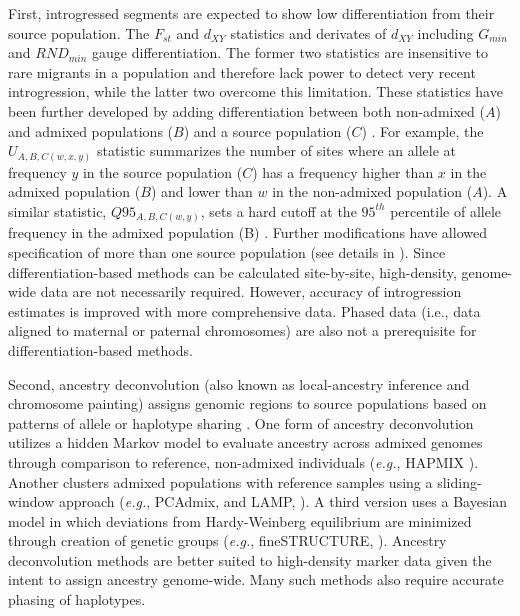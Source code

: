 \documentclass[11pt]{article}
\begin{document}
First, introgressed segments are expected to show low differentiation from their source population.
The $F_{st}$ and $d_{XY}$ statistics and derivates of $d_{XY}$ including $G_{min}$ \citep{geneva2015} and $RND_{min}$ \citep{rosenzweig2016} gauge differentiation. 
The former two statistics are insensitive to rare migrants in a population and therefore lack power to detect very recent introgression, while the latter two overcome this limitation.
These statistics have been further developed by adding differentiation between both non-admixed ($A$) and admixed populations ($B$) and a source population ($C$) \citep{racimo2016}. 
For example, the $U_{A,B,C(w,x,y)}$ statistic summarizes the number of sites where an allele at frequency $y$ in the source population ($C$) has a frequency higher than $x$ in the admixed population ($B$) and lower than $w$ in the non-admixed population ($A$).
A similar statistic, $Q95_{A,B,C(w,y)}$, sets a hard cutoff at the $95^{th}$ percentile of allele frequency in the admixed population (B) \citep{racimo2016}.
Further modifications have allowed specification of more than one source population (see details in \citealt{racimo2016}).
Since differentiation-based methods can be calculated site-by-site, high-density, genome-wide data are not necessarily required.
However, accuracy of introgression estimates is improved with more comprehensive data.
Phased data (i.e., data aligned to maternal or paternal chromosomes) are also not a prerequisite for differentiation-based methods.
 
Second, ancestry deconvolution (also known as local-ancestry inference and chromosome painting) assigns genomic regions to source populations based on patterns of allele or haplotype sharing \citep{schraiber2015}. 
One form of ancestry deconvolution utilizes a hidden Markov model to evaluate ancestry across admixed genomes through comparison to reference, non-admixed individuals (\emph{e.g.}, HAPMIX \citealt{Price2009}). 
Another clusters admixed populations with reference samples using a sliding-window approach (\emph{e.g.}, PCAdmix, \citealt{brisbin2012pcadmix} and LAMP, \citealt{sankararaman2008}).
A third version uses a Bayesian model \citep{pritchard2000} in which deviations from Hardy-Weinberg equilibrium are minimized through creation of genetic groups (\emph{e.g.}, fineSTRUCTURE, \citealt{Lawson2012}).
Ancestry deconvolution methods are better suited to high-density marker data given the intent to assign ancestry genome-wide.
Many such methods also require accurate phasing of haplotypes.
\end{document}
